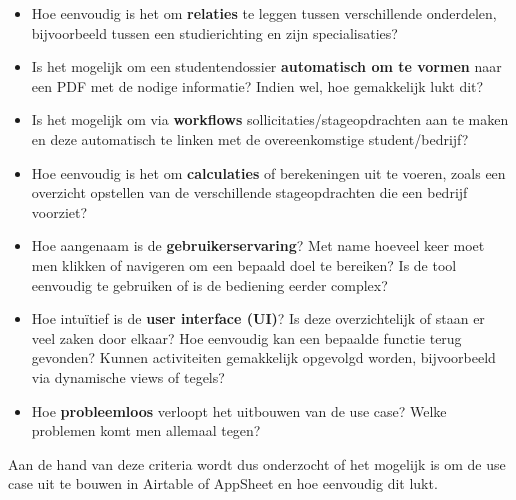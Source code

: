 \begin{itemize}
    \item Hoe eenvoudig is het om \textbf{relaties} te leggen tussen verschillende onderdelen, bijvoorbeeld tussen een studierichting en zijn specialisaties?
    \item Is het mogelijk om een studentendossier \textbf{automatisch om te vormen} naar een PDF met de nodige informatie? Indien wel, hoe gemakkelijk lukt dit?
    \item Is het mogelijk om via \textbf{workflows} sollicitaties/stageopdrachten aan te maken en deze automatisch te linken met de overeenkomstige student/bedrijf?
    \item Hoe eenvoudig is het om \textbf{calculaties} of berekeningen uit te voeren, zoals een overzicht opstellen van de verschillende stageopdrachten die een bedrijf voorziet?
    \item Hoe aangenaam is de \textbf{gebruikerservaring}? Met name hoeveel keer moet men klikken of navigeren om een bepaald doel te bereiken? Is de tool eenvoudig te gebruiken of is de bediening eerder complex?
    \item Hoe intuïtief is de \textbf{user interface (UI)}? Is deze overzichtelijk of staan er veel zaken door elkaar? Hoe eenvoudig kan een bepaalde functie terug gevonden? Kunnen activiteiten gemakkelijk opgevolgd worden, bijvoorbeeld via dynamische views of tegels?
    \item Hoe \textbf{probleemloos} verloopt het uitbouwen van de use case? Welke problemen komt men allemaal tegen?
\end{itemize}

Aan de hand van deze criteria wordt dus onderzocht of het mogelijk is om de use case uit te bouwen in Airtable of AppSheet en hoe eenvoudig dit lukt.


